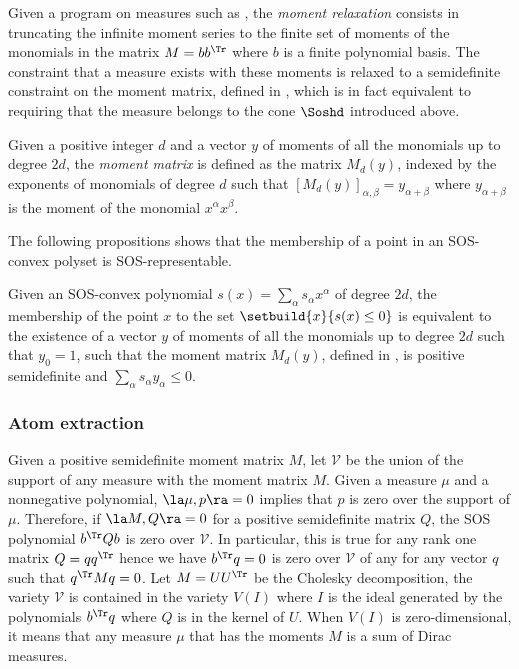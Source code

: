 \documentclass[11pt,twoside,a4paper,openright]{uclouvain-thesis}
\begin{document}
Given a program on measures such as ,
the \emph{moment relaxation} consists in truncating the infinite moment series to the finite
set of moments of the monomials in the matrix $M = bb^\Tr$ where $b$
is a finite polynomial basis.
The constraint that a measure exists with these moments is relaxed to a semidefinite
constraint on the moment matrix, defined in , which is in fact equivalent to requiring that the measure belongs
to the cone $\Soshd$ introduced above.

\begin{mydef}
  \label{def:moment_matrix}
  Given a positive integer $d$ and a vector $y$ of moments of all the monomials
  up to degree $2d$, the \emph{moment matrix} is defined as the matrix $M_d(y)$,
  indexed by the exponents of monomials of degree $d$ such that
  $[M_d(y)]_{\alpha, \beta} = y_{\alpha + \beta}$ where $y_{\alpha + \beta}$ is
  the moment of the monomial $x^\alpha x^\beta$.
\end{mydef}

The following propositions shows that the membership of a point in an SOS-convex
polyset is SOS-representable.

\begin{myprop}
  \label{prop:sdprep}
  Given an SOS-convex polynomial $s(x) = \sum_\alpha s_\alpha x^\alpha$ of degree $2d$,
  the membership of the point $x$ to the set $\setbuild{x}{s(x) \le 0}$
  is equivalent to the existence of a vector $y$ of moments of all the monomials
  up to degree $2d$ such that $y_0 = 1$,
  such that the moment matrix $M_d(y)$, defined in ,
  is positive semidefinite and $\sum_{\alpha} s_\alpha y_\alpha \le 0$.
\end{myprop}

\subsubsection{Atom extraction}
\label{sec:atom}

Given a positive semidefinite moment matrix $M$,
let $\mathcal{V}$ be the union of the support of any measure with the moment matrix $M$.
Given a measure $\mu$ and a nonnegative polynomial,
$\la \mu, p \ra = 0$ implies that $p$ is zero over the support of $\mu$.
Therefore, if $\la M, Q \ra = 0$ for a positive semidefinite matrix $Q$,
the SOS polynomial $b^\Tr Q b$ is zero over $\mathcal{V}$.
In particular, this is true for any rank one matrix $Q = q q^\Tr$ hence
we have $b^\Tr q = 0$ is zero over $\mathcal{V}$ of any for any vector $q$ such that $q^\Tr M q = 0$.
Let $M = UU^\Tr$ be the Cholesky decomposition, the variety $\mathcal{V}$ is contained in
the variety $V(I)$ where $I$ is the ideal generated by the polynomials $b^\Tr q$
where $Q$ is in the kernel of $U$.
When $V(I)$ is zero-dimensional, it means that any measure $\mu$ that has the moments $M$
is a sum of Dirac measures.
\end{document}
